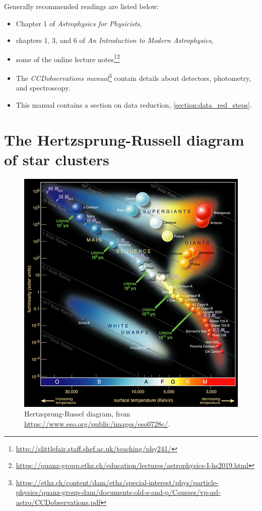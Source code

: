 \documentclass[a4paper, 11pt, fleqn]{memoir}
\begin{document}
Generally recommended readings are listed below:
\begin{itemize}
    \item Chapter 1 of \emph{Astrophysics for Physicists}\autocite{Choudhuri}, \item chapters 1, 3, and 6 of \emph{An Introduction to Modern Astrophysics}\autocite{carroll2017introduction}, \item some of the online lecture notes\footnote{\url{http://slittlefair.staff.shef.ac.uk/teaching/phy241/}}\footnote{\url{https://quanz-group.ethz.ch/education/lectures/astrophysics-I-hs2019.html}} \item The \emph{CCDobservations manual}\footnote{\url{https://ethz.ch/content/dam/ethz/special-interest/phys/particle-physics/quanz-group-dam/documents-old-s-and-p/Courses/vp-asl-astro/CCDobservations.pdf}} contain details about detectors, photometry, and spectroscopy.
    \item
          This manual contains a section on data reduction,
          \cref{section:data_red_steps}.
\end{itemize}

\section{The Hertzsprung-Russell diagram of star clusters}
\begin{figure}
    \centering
    \includegraphics[width=\linewidth]{Hertzsprung-Russel_StarData}
    \caption{Hertzsprung-Russel diagram, from \url{https://www.eso.org/public/images/eso0728c/}.}
    \label{fig:hrdiagram}
\end{figure}
\end{document}
